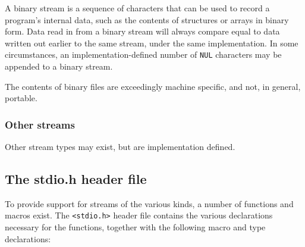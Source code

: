    A binary stream is a sequence of characters that can be used to record
     a program's internal data, such as the contents of structures or arrays in
     binary form.  Data read in from a binary stream will always compare equal
     to data written out earlier to the same stream, under the same
     implementation.  In some circumstances, an implementation-defined number
     of \texttt{NUL} characters may be appended to a binary stream.


    The contents of binary files are exceedingly machine specific, and not,
     in general, portable.


   

   \subsubsection{Other streams}
    

    Other stream types may exist, but are implementation defined.


   

  

  \subsection{The stdio.h header file}
   

   To provide support for streams of the various kinds, a number of
    functions and macros exist.  The \texttt{<stdio.h>} header file
    contains the various declarations necessary for the functions, together
    with the following macro and type declarations:


